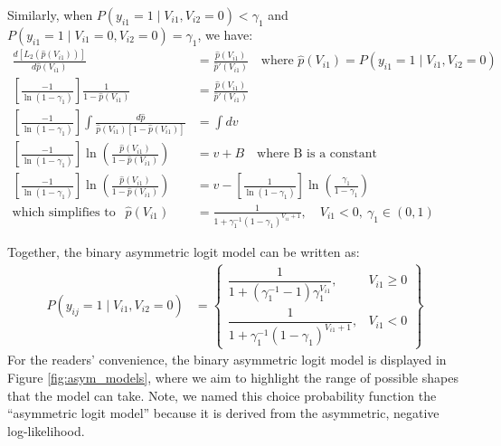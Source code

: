 Similarly, when $P \left( y_{i1} = 1 \mid V_{i1}, V_{i2} = 0 \right) < \gamma_1$ and $P \left( y_{i1} = 1 \mid V_{i1} =0, V_{i2} = 0 \right) = \gamma_1$, we have:
\begin{equation}
\begin{aligned}
\frac{d \left[ L_{2} \left( \hat{p} \left( V_{i1} \right) \right) \right]}{d \hat{p} \left( V_{i1} \right)} &= \frac{\hat{p} \left( V_{i1} \right) }{ \hat{p}' \left( V_{i1} \right) } \quad \textrm{where } \hat{p} \left( V_{i1} \right) = P \left( y_{i1} = 1 \mid V_{i1}, V_{i2} = 0 \right) \\
\left[ \frac{-1}{\ln \left( 1- \gamma_1 \right)} \right] \frac{1}{1 - \hat{p} \left( V_{i1} \right)} &= \frac{\hat{p} \left( V_{i1} \right) }{ \hat{p}' \left( V_{i1} \right) } \\
\left[ \frac{-1}{\ln \left( 1 - \gamma_1 \right)} \right] \int \frac{ d \hat{p} }{\hat{p} \left( V_{i1} \right) \left[ 1 - \hat{p} \left( V_{i1} \right) \right]} &= \int d v \\
\left[ \frac{-1}{\ln \left( 1 - \gamma_1 \right)} \right] \ln \left( \frac{ \hat{p} \left( V_{i1} \right) }{ 1 - \hat{p} \left( V_{i1} \right) } \right) &= v + B \quad \textrm{where B is a constant} \\
\left[ \frac{-1}{\ln \left( 1- \gamma_1 \right)} \right] \ln \left( \frac{ \hat{p} \left( V_{i1} \right) }{ 1 - \hat{p} \left( V_{i1} \right) } \right) &= v - \left[ \frac{1}{\ln \left( 1 - \gamma_1 \right)} \right] \ln \left( \frac{ \gamma_1 }{ 1 - \gamma_1 } \right)\\
\textrm{which simplifies to } \ \  \hat{p} \left( V_{i1} \right) &= \frac{1}{1 + \gamma _1 ^{-1} \left( 1 - \gamma_1 \right)^{ V_{i1} + 1} }, \quad V_{i1} < 0,\  \gamma_1 \in \left( 0, 1 \right)
\end{aligned}
\end{equation}

Together, the binary asymmetric logit model can be written as:
\begin{equation}
\label{eq:binary_asym_logit}
\begin{aligned}
P \left( y_{ij} = 1 \mid V_{i1}, V_{i2} = 0 \right) &= \left\lbrace \begin{array}{cc}
\dfrac{1}{1 + \left( \gamma_1^{-1} - 1 \right) \gamma_1^{V_{i1}} }, & V_{i1} \geq 0
\\[2ex]
\dfrac{1}{1 + \gamma _1 ^{-1} \left( 1 - \gamma_1 \right)^{ V_{i1} + 1} }, & V_{i1} < 0
\end{array} \right\rbrace
\end{aligned}
\end{equation}
For the readers' convenience, the binary asymmetric logit model is displayed in Figure \ref{fig:asym_models}, where we aim to highlight the range of possible shapes that the model can take. Note, we named this choice probability function the ``asymmetric logit model'' because it is derived from the asymmetric, negative log-likelihood. 

